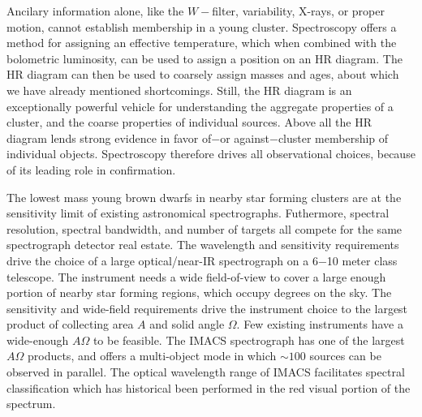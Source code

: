 Ancilary information alone, like the $W-$filter, variability, X-rays, or proper motion, cannot establish membership in a young cluster.  Spectroscopy offers a method for assigning an effective temperature, which when combined with the bolometric luminosity, can be used to assign a position on an HR diagram.  The HR diagram can then be used to coarsely assign masses and ages, about which we have already mentioned shortcomings.  Still, the HR diagram is an exceptionally powerful vehicle for understanding the aggregate properties of a cluster, and the coarse properties of individual sources.  Above all the HR diagram lends strong evidence in favor of$-$or against$-$cluster membership of individual objects.  Spectroscopy therefore drives all observational choices, because of its leading role in confirmation.

The lowest mass young brown dwarfs in nearby star forming clusters are at the sensitivity limit of existing astronomical spectrographs.  Futhermore, spectral resolution, spectral bandwidth, and number of targets all compete for the same spectrograph detector real estate.  The wavelength and sensitivity requirements drive the choice of a large optical/near-IR spectrograph on a 6$-$10 meter class telescope.  The instrument needs a wide field-of-view to cover a large enough portion of nearby star forming regions, which occupy degrees on the sky.  The sensitivity and wide-field requirements drive the instrument choice to the largest product of collecting area $A$ and solid angle $\Omega$.  Few existing instruments have a wide-enough $A\Omega$ to be feasible.  The IMACS spectrograph has one of the largest $A\Omega$ products, and offers a multi-object mode in which $\sim100$ sources can be observed in parallel.  The optical wavelength range of IMACS facilitates spectral classification which has historical been performed in the red visual portion of the spectrum.


